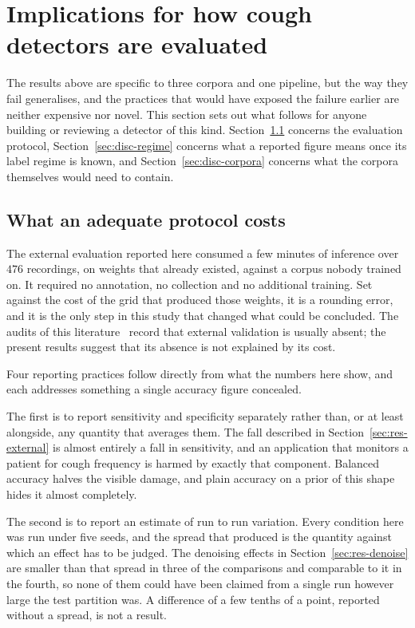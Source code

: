 \section{Implications for how cough detectors are evaluated}\label{sec:discussion}

The results above are specific to three corpora and one pipeline, but the way they fail
generalises, and the practices that would have exposed the failure earlier are neither
expensive nor novel. This section sets out what follows for anyone building or reviewing
a detector of this kind. Section~\ref{sec:disc-protocol} concerns the evaluation protocol,
Section~\ref{sec:disc-regime} concerns what a reported figure means once its label regime
is known, and Section~\ref{sec:disc-corpora} concerns what the corpora themselves would
need to contain.

\subsection{What an adequate protocol costs}\label{sec:disc-protocol}

The external evaluation reported here consumed a few minutes of inference over $476$
recordings, on weights that already existed, against a corpus nobody trained on. It
required no annotation, no collection and no additional training. Set against the cost of
the grid that produced those weights, it is a rounding error, and it is the only step in
this study that changed what could be concluded. The audits of this
literature~\cite{roberts2021, han2022} record that external validation is usually absent;
the present results suggest that its absence is not explained by its cost.

Four reporting practices follow directly from what the numbers here show, and each
addresses something a single accuracy figure concealed.

The first is to report sensitivity and specificity separately rather than, or at least
alongside, any quantity that averages them. The fall described in
Section~\ref{sec:res-external} is almost entirely a fall in sensitivity, and an
application that monitors a patient for cough frequency is harmed by exactly that
component. Balanced accuracy halves the visible damage, and plain accuracy on a prior of
this shape hides it almost completely.

The second is to report an estimate of run to run variation. Every condition here was run
under five seeds, and the spread that produced is the quantity against which an effect has
to be judged. The denoising effects in Section~\ref{sec:res-denoise} are smaller than that
spread in three of the comparisons and comparable to it in the fourth, so none of them
could have been claimed from a single run however large the test partition was. A
difference of a few tenths of a point, reported without a spread, is not a result.

